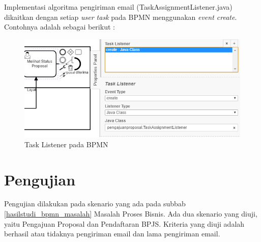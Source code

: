 Implementasi algoritma pengiriman email (TaskAssignmentListener.java) dikaitkan dengan setiap \textit{user task} pada BPMN menggunakan \textit{event create}. Contohnya adalah sebagai berikut :
	\begin{figure}[H]
			\centering
			\includegraphics[scale=0.8]{Gambar/Bab-5/taskListener}
			\caption{Task Listener pada BPMN} 
			\label{fig:pengujian_taskListener}
	\end{figure}




\section{Pengujian}
\label{sec:pengujian}
Pengujian dilakukan pada skenario yang ada pada subbab \ref{hasilstudi_bpmn_masalah} Masalah Proses Bisnis. Ada dua skenario yang diuji, yaitu Pengajuan Proposal dan Pendaftaran BPJS. Kriteria yang diuji adalah berhasil atau tidaknya pengiriman email dan lama pengiriman email.

